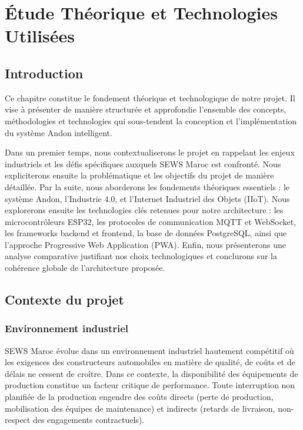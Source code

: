 ﻿%
\chapter{Étude Théorique et Technologies Utilisées}

\section*{Introduction}

Ce chapitre constitue le fondement théorique et technologique de notre projet. Il vise à présenter de manière structurée et approfondie l'ensemble des concepts, méthodologies et technologies qui sous-tendent la conception et l'implémentation du système Andon intelligent.

Dans un premier temps, nous contextualiserons le projet en rappelant les enjeux industriels et les défis spécifiques auxquels SEWS Maroc est confronté. Nous expliciterons ensuite la problématique et les objectifs du projet de manière détaillée. Par la suite, nous aborderons les fondements théoriques essentiels : le système Andon, l'Industrie 4.0, et l'Internet Industriel des Objets (IIoT). Nous explorerons ensuite les technologies clés retenues pour notre architecture : les microcontrôleurs ESP32, les protocoles de communication MQTT et WebSocket, les frameworks backend et frontend, la base de données PostgreSQL, ainsi que l'approche Progressive Web Application (PWA). Enfin, nous présenterons une analyse comparative justifiant nos choix technologiques et conclurons sur la cohérence globale de l'architecture proposée.

\section{Contexte du projet}

\subsection{Environnement industriel}

SEWS Maroc évolue dans un environnement industriel hautement compétitif où les exigences des constructeurs automobiles en matière de qualité, de coûts et de délais ne cessent de croître. Dans ce contexte, la disponibilité des équipements de production constitue un facteur critique de performance. Toute interruption non planifiée de la production engendre des coûts directs (perte de production, mobilisation des équipes de maintenance) et indirects (retards de livraison, non-respect des engagements contractuels).

